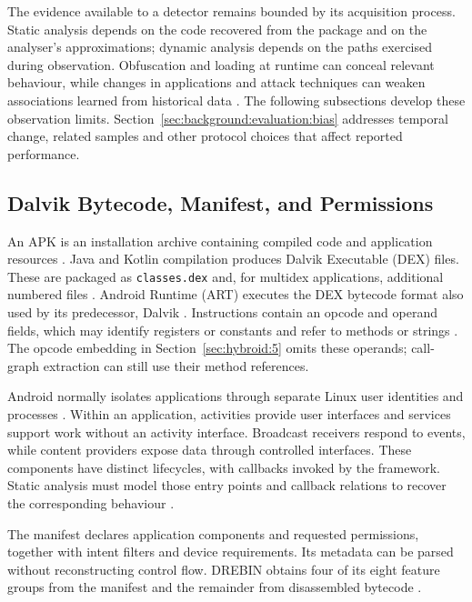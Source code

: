 The evidence available to a detector remains bounded by its acquisition process. Static
analysis depends on the code recovered from the package and on the analyser's approximations;
dynamic analysis depends on the paths exercised during observation. Obfuscation and loading at
runtime can conceal relevant behaviour, while changes in applications and attack techniques can
weaken associations learned from historical data \cite{liu2023deeplearning}. The following
subsections develop these observation limits. Section~\ref{sec:background:evaluation:bias}
addresses temporal change, related samples and other protocol choices that affect reported
performance.

\subsection{Dalvik Bytecode, Manifest, and Permissions}
\label{sec:background:android:artefacts}

An APK is an installation archive containing compiled code and application resources
\cite{aosp2026appfundamentals}. Java and Kotlin compilation produces Dalvik Executable (DEX)
files. These are packaged as \texttt{classes.dex} and, for multidex applications, additional
numbered files \cite{aosp2026dexformat}. Android Runtime (ART) executes the DEX bytecode format also
used by its predecessor, Dalvik \cite{aosp2026art}. Instructions contain an opcode and
operand fields, which may identify registers or constants and refer to methods or strings
\cite{aosp2026dalvikbytecode}. The opcode embedding in Section~\ref{sec:hybroid:5} omits
these operands; call-graph extraction can still use their method references.

Android normally isolates applications through separate Linux user identities and processes
\cite{aosp2026appfundamentals}. Within an application, activities provide user interfaces and
services support work without an activity interface. Broadcast receivers respond to events,
while content providers expose data through controlled interfaces. These components have
distinct lifecycles, with callbacks invoked by the framework. Static analysis must model those
entry points and callback relations to recover the corresponding behaviour
\cite{arzt2014flowdroid}.

The manifest declares application components and requested permissions, together with intent
filters and device requirements. Its metadata can be parsed without reconstructing control
flow. DREBIN obtains four of its eight feature groups from the manifest and the remainder from
disassembled bytecode \cite{arp2014drebin}.

